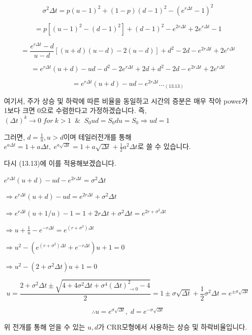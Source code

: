 \documentclass[
  letterpaper,
  DIV=11,
  numbers=noendperiod]{scrreprt}
\begin{document}
\[\sigma^2\Delta t=p(u-1)^2+(1-p)(d-1)^2-(e^{r\Delta t}-1)^2\]

\[=p[(u-1)^2-(d-1)^2]+(d-1)^2-e^{2r\Delta t}+2e^{r\Delta t}-1\]

\[=\frac{e^{r\Delta t}-d}{u-d}[(u+d)(u-d)-2(u-d)]+d^2-2d-e^{2r\Delta t}+2e^{r\Delta t}\]

\[=e^{r\Delta t}(u+d)-ud-d^2-2e^{r\Delta t}+2d+d^2-2d-e^{2r\Delta t}+2e^{r\Delta t}\]

\[=e^{r\Delta t}(u+d)-ud-e^{2r\Delta t}..._{(13.13)}\]

여기서, 주가 상승 및 하락에 따른 비율을 동일하고 시간의 증분은 매우 작아
power가 1보다 크면 0으로 수렴한다고 가정하겠습니다. 즉,
\((\Delta t)^k\rightarrow 0\;for\;k>1\;\;\&\;\;S_0ud=S_0du=S_0\Rightarrow ud=1\)

그러면, \(d=\frac{1}{u},u>d\)이며 테일러전개를 통해
\(e^{a\Delta t}=1+a\Delta t,\; e^{a\sqrt{\Delta t}}=1+a\sqrt{\Delta t}+\frac{1}{2}a^2\Delta t\)로
쓸 수 있습니다.

다시 (13.13)에 이를 적용해보겠습니다.

\(e^{r\Delta t}(u+d)-ud-e^{2r\Delta t}=\sigma^2\Delta t\)

\(\Rightarrow e^{r\Delta t}(u+d)-ud=e^{2r\Delta t}+\sigma^2\Delta t\)

\(\Rightarrow e^{r\Delta t}(u+1/u)-1=1+2r\Delta t+\sigma^2\Delta t=e^{2r+\sigma^2\Delta t}\)

\(\Rightarrow u+\frac{1}{u}-e^{-r\Delta t}=e^{(r+\sigma^2)\Delta t}\)

\(\Rightarrow u^2-(e^{(r+\sigma^2)\Delta t}+e^{-r\Delta t})u+1=0\)

\(\Rightarrow u^2-(2+\sigma^2\Delta t)u+1=0\)

\[u=\frac{2+\sigma^2\Delta t\pm\sqrt{4+4\sigma^2\Delta t+\sigma^4 (\Delta t)^2_{\rightarrow 0}-4}}{2}=1\pm\sigma\sqrt{\Delta t}+\frac{1}{2}\sigma^2\Delta t=e^{\pm\sigma\sqrt{\Delta t}}\]

\[\therefore u=e^{\sigma\sqrt{\Delta t}},\;d=e^{-\sigma\sqrt{\Delta t}}\]

위 전개를 통해 얻을 수 있는 \(u,d\)가 CRR모형에서 사용하는 상승 및
하락비율입니다.
\end{document}
